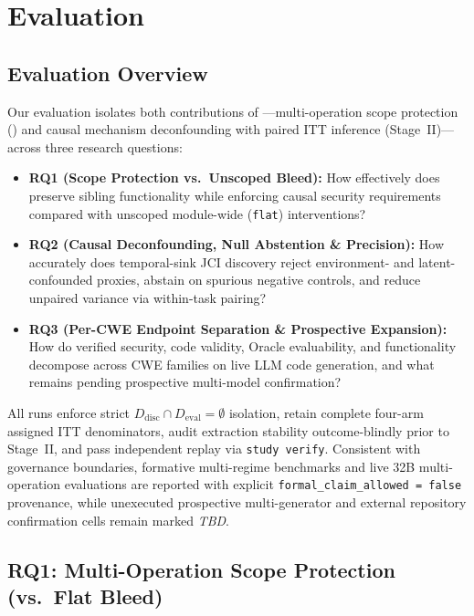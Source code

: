 \section{Evaluation}
\label{sec:evaluation}
\newcommand{\pendingresult}{\textit{TBD}\xspace}

\subsection{Evaluation Overview}

Our evaluation isolates both contributions of \model---multi-operation scope
protection (\prompttsg) and causal mechanism deconfounding with paired ITT
inference (Stage~II)---across three research questions:
\begin{itemize}
  \item \textbf{RQ1 (Scope Protection vs.\ Unscoped Bleed):} How effectively does
  \prompttsg preserve sibling functionality while enforcing causal security
  requirements compared with unscoped module-wide (\texttt{flat}) interventions?
  \item \textbf{RQ2 (Causal Deconfounding, Null Abstention \& Precision):} How
  accurately does temporal-sink JCI discovery reject environment- and
  latent-confounded proxies, abstain on spurious negative controls, and reduce
  unpaired variance via within-task pairing?
  \item \textbf{RQ3 (Per-CWE Endpoint Separation \& Prospective Expansion):} How
  do verified security, code validity, Oracle evaluability, and functionality
  decompose across CWE families on live LLM code generation, and what remains
  pending prospective multi-model confirmation?
\end{itemize}

All runs enforce strict $D_{\mathrm{disc}} \cap D_{\mathrm{eval}} = \emptyset$
isolation, retain complete four-arm assigned ITT denominators, audit extraction
stability outcome-blindly prior to Stage~II, and pass independent replay via
\texttt{study verify}. Consistent with governance boundaries, formative
multi-regime benchmarks and live 32B multi-operation evaluations are reported with
explicit \texttt{formal\_claim\_allowed = false} provenance, while unexecuted
prospective multi-generator and external repository confirmation cells remain
marked \pendingresult.

\subsection{RQ1: Multi-Operation Scope Protection (\prompttsg vs.\ Flat Bleed)}
\label{sec:rq1}

